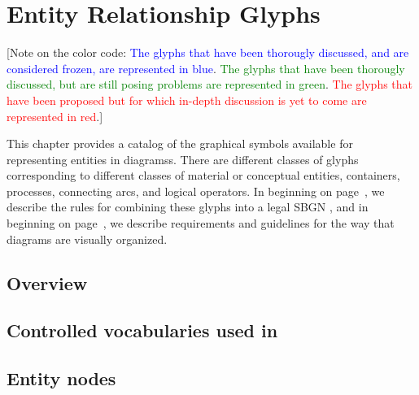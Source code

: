 
\chapter{Entity Relationship Glyphs}

[Note on the color code: \textcolor{blue}{The glyphs that have been thorougly discussed, and are considered frozen, are represented in blue}. \textcolor{green}{The glyphs that have been thorougly discussed, but are still posing problems are represented in green}. \textcolor{red}{The glyphs that have been proposed but for which in-depth discussion is yet to come are represented in red}.]

This chapter provides a catalog of the graphical symbols available for representing entities in \ER diagramss.  There are different classes of glyphs corresponding to different classes of material or conceptual entities, containers, processes, connecting arcs, and logical operators.  In  beginning on page~\pageref{chp:grammar}, we describe the rules for combining these glyphs into a legal SBGN \ER, and in  beginning on page~\pageref{chp:layout}, we describe requirements and guidelines for the way that diagrams are visually organized.

\section{Overview}
 

 
\section{Controlled vocabularies used in \SBGNERLone}\label{sec:CVs}


 
 
 \section{Entity nodes}\label{sec:ENs}


